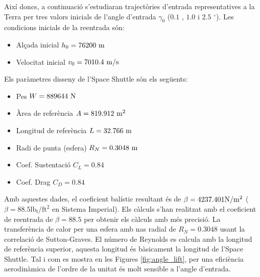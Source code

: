 Així doncs, a continuació s'estudiaran trajectòries d'entrada representatives a la Terra per tres valors inicials de l'angle d'entrada $\gamma_0$ ($0.1$ , $1.0$ i $2.5$ $^\circ$). Les condicions inicials de la reentrada són:
\begin{itemize}
    \item Alçada inicial $h_0 = 76200 \ \meter$
    \item Velocitat inicial $v_0 = 7010.4 \ \meter/\second$
\end{itemize}
Els paràmetres disseny de l'Space Shuttle són els següents:
\begin{itemize}
    \item Pes $W = 889644 \ \newton$
    \item Àrea de referència $A = 819.912 \ \meter^2$
    \item Longitud de referència $L = 32.766 \ \meter$
    \item Radi de punta (esfera) $R_N = 0.3048 \ \meter$
    \item Coef. Sustentació $C_L = 0.84 $
    \item Coef. Drag $C_D = 0.84 $
\end{itemize}

Amb aquestes dades, el coeficient balístic resultant és de $\beta = 4237.401 \newton/\meter^2$ ($\beta=88.5 \mathrm{lb_f}/\mathrm{ft^2}$ en Sistema Imperial). Els càlculs s'han realitzat amb el coeficient de reentrada de $\beta=88.5$ per obtenir els càlculs amb més precisió. 
La transferència de calor per una esfera amb nas radial de $R_N = 0.3048$ usant la correlació de Sutton-Graves. El número de Reynolds es calcula amb la longitud de referència superior, aquesta longitud és bàsicament la longitud de l'Space Shuttle. Tal i com es mostra en les Figures \ref{fig:angle_lift}, per una eficiència aerodinàmica de l'ordre de la unitat és molt sensible a l'angle d'entrada. 

